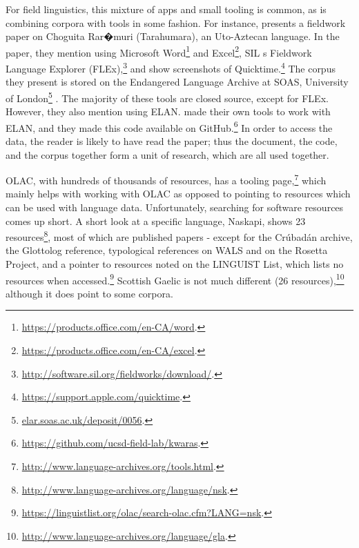 For field linguistics, this mixture of apps and small tooling is common, as is combining corpora with tools in some fashion. For instance, \citet{caballero2017choguita} presents a fieldwork paper on Choguita Rar�muri (Tarahumara), an Uto-Aztecan language. In the paper, they mention using Microsoft Word\footnote{\href{https://products.office.com/en-CA/word}{https://products.office.com/en-CA/word}. } and Excel\footnote{\href{https://products.office.com/en-CA/excel}{https://products.office.com/en-CA/excel}. }, SIL
s Fieldwork Language Explorer (FLEx),\footnote{\href{http://software.sil.org/fieldworks/download/.}{http://software.sil.org/fieldworks/download/}. } and show screenshots of Quicktime.\footnote{\href{https://support.apple.com/quicktime}{https://support.apple.com/quicktime}. } The corpus they present is stored on the Endangered Language Archive at SOAS, University of London\footnote{\href{elar.soas.ac.uk/deposit/0056}{elar.soas.ac.uk/deposit/0056}. } \citep{caballero2009data}. The majority of these tools are closed source, except for FLEx. However, they also mention using ELAN. \citet{caballero2017choguita} made their own tools to work with ELAN, and they made this code available on GitHub.\footnote{\href{https://github.com/ucsd-field-lab/kwaras}{https://github.com/ucsd-field-lab/kwaras}. } In order to access the data, the reader is likely to have read the paper; thus the document, the code, and the corpus together form a unit of research, which are all used together.

OLAC, with hundreds of thousands of resources, has a tooling page,\footnote{\href{http://www.language-archives.org/tools.html}{http://www.language-archives.org/tools.html}. } which mainly helps with working with OLAC as opposed to pointing to resources which can be used with language data. Unfortunately, searching for software resources comes up short. A short look at a specific language, Nask\-api, shows 23 resources\footnote{\href{http://www.language-archives.org/language/nsk}{http://www.language-archives.org/language/nsk}. }, most of which are published papers - except for the Cr\'ubad\'an archive, the Glottolog reference, typological references on WALS and on the Rosetta Project, and a pointer to resources noted on the LINGUIST List, which lists no resources when accessed.\footnote{\href{https://linguistlist.org/olac/search-olac.cfm?LANG=nsk}{https://linguistlist.org/olac/search-olac.cfm?LANG=nsk}. } Scottish Gaelic is not much different (26 resources),\footnote{\href{http://www.language-archives.org/language/gla}{http://www.language-archives.org/language/gla}. } although it does point to some corpora.

